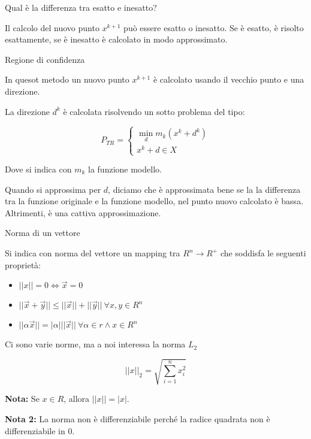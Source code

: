 \begin{domanda}
    Qual è la differenza tra esatto e inesatto?

    Il calcolo del nuovo punto $x^{k+1}$ può essere esatto o inesatto. Se è esatto, è risolto esattamente,
    se è inesatto è calcolato in modo approssimato.
\end{domanda}

\begin{definition}
    Regione di confidenza

    In quesot metodo un nuovo punto $x^{k+1}$ è calcolato usando il vecchio punto e una direzione.

    La direzione $d^k$ è calcolata risolvendo un sotto problema del tipo:

    $$
    P_{TR} = \begin{cases}
        \min_{d} m_k(x^k + d^k) \\
        x^k + d \in X
    \end{cases}
    $$

    Dove si indica con $m_k$ la funzione modello.

    Quando si approssima per $d$, diciamo che è approssimata bene se la 
    la differenza tra la funzione originale e la funzione modello, nel punto nuovo calcolato 
    è bassa. Altrimenti, è una cattiva approssimazione.
\end{definition}


\begin{definition}
    Norma di un vettore

    Si indica con norma del vettore un mapping tra $R^n \rightarrow R^+$ che soddisfa le seguenti proprietà:
    \begin{itemize}
        \item $||x|| = 0 \iff \vec{x} = 0$
        \item $||\vec{x}+\vec{y}|| \leq ||\vec{x}|| + ||\vec{y}|| \ \forall x,y \in R^n$
        \item $||\alpha \vec{x}|| = |\alpha| ||\vec{x}|| \ \forall \alpha \in r \land x \in R^n$
    \end{itemize}
\end{definition}

Ci sono varie norme, ma a noi interessa la norma $L_2$

$$
||x||_2 = \sqrt{\sum_{i=1}^n x_i^2}
$$

\textbf{Nota:} Se $x \in R$, allora $||x|| = |x|$.

\textbf{Nota 2:} La norma non è differenziabile perché la radice quadrata non è differenziabile in $0$.

